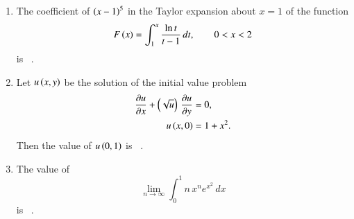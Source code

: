 \documentclass[journal,12pt,onecolumn]{IEEEtran}
\theoremstyle{remark}
\begin{document}
\begin{enumerate}[start=1, label=Q.\arabic*]
\hfill{}


\item The coefficient of $\left(x-1\right)^{5}$ in the Taylor expansion about $x=1$ of the function
\[
F\left(x\right)=\int_{1}^{x}\frac{\ln t}{t-1}\, dt,\qquad 0<x<2
\]
is \underline{\hspace{2cm}} \ .

\hfill{}

\item Let $u\left(x,y\right)$ be the solution of the initial value problem
\begin{align*}
\frac{\partial u}{\partial x} + \left(\sqrt{u}\right)\,\frac{\partial u}{\partial y} &= 0, \\
u\left(x,0\right) &= 1 + x^{2}.
\end{align*}
Then the value of $u\left(0,1\right)$ is \underline{\hspace{2cm}} \ .

\hfill{}


\item The value of
\[
\lim_{n\to \infty}\int_{0}^{1} n\,x^{n} e^{x^{2}} \, dx
\]
is \underline{\hspace{2cm}} \ .

\hfill{}

\end{enumerate}
\end{document}
